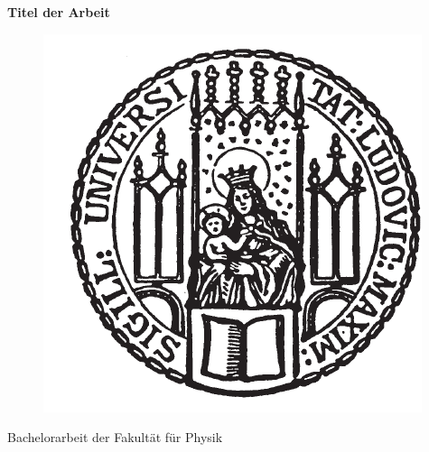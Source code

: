 \graphicspath{{img/}}
\lhead[\fancyplain{}{\thepage}]{\fancyplain{}{\rightmark}}
\rhead[\fancyplain{}{\leftmark}]{\fancyplain{}{\thepage}}
\cfoot{}
\begin{titlepage}
    \begin{center}
        \vspace*{0.65cm}
        \huge
        \hspace*{-0.73cm}
        \textbf{Titel der Arbeit}\\
        \vspace*{2.2cm}

        \begin{figure}[h]
            \begin{center}
                \hspace*{-0.73cm}
                \includegraphics{lmu_siegel}
            \end{center}
            \label{fig:lmulogo}
        \end{figure}
        \vspace*{0.5cm}
        \Large
        \hspace*{-0.73cm}
        \hspace*{-0.5cm}Bachelorarbeit der Fakultät für Physik\\
        \vspace*{0.1cm}
        \hspace*{-0.73cm}

\end{center}
\end{titlepage}
